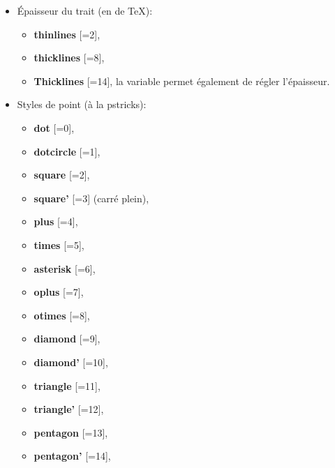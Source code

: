 \begin{itemize}
\begin{itemize}
    \item Épaisseur du trait (en  de \TeX):
        \begin{itemize}
        \item \textbf{thinlines} [=2],
            \item \textbf{thicklines} [=8],
            \item \textbf{Thicklines} [=14], la variable  permet également de régler l'épaisseur.
        \end{itemize}
    \item Styles de point (à la pstricks):
        \begin{itemize}
        \item \textbf{dot} [=0],
            \item \textbf{dotcircle} [=1],
            \item \textbf{square} [=2],
            \item \textbf{square'} [=3] (carré plein),
            \item \textbf{plus} [=4],
            \item \textbf{times} [=5],
            \item \textbf{asterisk} [=6],
            \item \textbf{oplus} [=7],
            \item \textbf{otimes} [=8],
            \item \textbf{diamond} [=9],
            \item \textbf{diamond'} [=10],
            \item \textbf{triangle} [=11],
            \item \textbf{triangle'} [=12],
            \item \textbf{pentagon} [=13],
            \item \textbf{pentagon'} [=14],
        \end{itemize}
     

\end{itemize}
\end{itemize}
